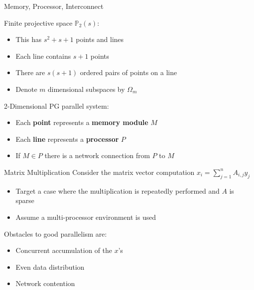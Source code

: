 \documentclass{beamer}
\begin{document}
\begin{frame}{Memory, Processor, Interconnect}
  \begin{block}{Finite projective space $\mathbb{P}_2(s)$:}
  \begin{itemize}
  \item This has $s^2+s+1$ points and lines
  \item Each line contains $s+1$ points
  \item There are $s(s+1)$ ordered pairs of points on a line
  \item Denote $m$ dimensional subspaces by $\Omega_m$
  \end{itemize}
  \end{block}
  \begin{block}{2-Dimensional PG parallel system:}
  \begin{itemize}
  \item Each {\bf point} represents a {\bf memory module} $M$
  \item Each {\bf line} represents a {\bf processor} $P$
  \item If $M \in P$ there is a network connection from $P$ to $M$
  \end{itemize}
  \end{block}
\end{frame}

\begin{frame}{Matrix Multiplication}
  Consider the matrix vector computation $x_i = \sum_{j=1}^{n} A_{i,j} y_j$
  \begin{itemize}
  \item Target a case where the multiplication is repeatedly performed and $A$ is sparse
  \item Assume a multi-processor environment is used
  \end{itemize}
  Obstacles to good parallelism are:
  \begin{itemize} 
  \item Concurrent accumulation of the $x$'s
  \item Even data distribution
  \item Network contention
  \end{itemize}
  \end{frame}
  
\end{document}
